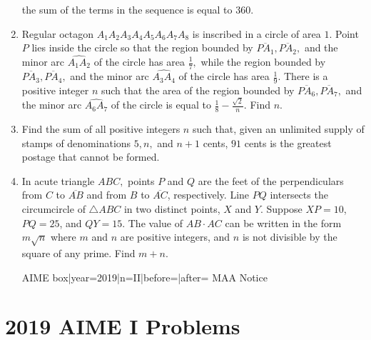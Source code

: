 \documentclass{article}
\begin{document}
\begin{enumerate}[label=\arabic*., itemsep=0.5em]
the sum of the terms in the sequence is equal to \(360.\)\par \vspace{0.5em}\item Regular octagon \(A_1A_2A_3A_4A_5A_6A_7A_8\) is inscribed in a circle of area \(1.\) Point \(P\) lies inside the circle so that the region bounded by \(\overline{PA_1},\overline{PA_2},\) and the minor arc \(\widehat{A_1A_2}\) of the circle has area \(\tfrac{1}{7},\) while the region bounded by \(\overline{PA_3},\overline{PA_4},\) and the minor arc \(\widehat{A_3A_4}\) of the circle has area \(\tfrac{1}{9}.\) There is a positive integer \(n\) such that the area of the region bounded by \(\overline{PA_6},\overline{PA_7},\) and the minor arc \(\widehat{A_6A_7}\) of the circle is equal to \(\tfrac{1}{8}-\tfrac{\sqrt2}{n}.\) Find \(n.\)\par \vspace{0.5em}\item Find the sum of all positive integers \(n\) such that, given an unlimited supply of stamps of denominations \(5,n,\) and \(n+1\) cents, \(91\) cents is the greatest postage that cannot be formed.\par \vspace{0.5em}\item In acute triangle \(ABC,\) points \(P\) and \(Q\) are the feet of the perpendiculars from \(C\) to \(\overline{AB}\) and from \(B\) to \(\overline{AC}\), respectively. Line \(PQ\) intersects the circumcircle of \(\triangle ABC\) in two distinct points, \(X\) and \(Y\). Suppose \(XP=10\), \(PQ=25\), and \(QY=15\). The value of \(AB\cdot AC\) can be written in the form \(m\sqrt n\) where \(m\) and \(n\) are positive integers, and \(n\) is not divisible by the square of any prime. Find \(m+n\).



{{AIME box|year=2019|n=II|before=|after=}}
{{MAA Notice}}\par \vspace{0.5em}\end{enumerate}\newpage\section*{2019 AIME I Problems}
\end{document}
